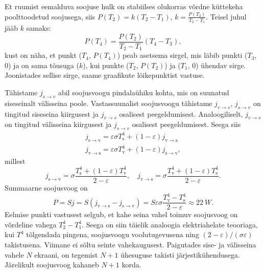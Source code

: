 \documentclass[10pt, twoside]{article}
\begin{document}
{
\solu
Et ruumist eemalduva soojuse hulk on stabiilses olukorras võrdne küttekeha poolttoodetud soojusega, siis $P(T_2) = k(T_2 - T_1)$, $k = \frac{P(T_2)}{T_2-T_1}$. Teisel juhul jääb $k$ samaks:
\[
P(T_4) = \frac{P(T_2)}{T_2-T_1} (T_4 - T_3), 
\]
kust on näha, et punkt ($T_4$, $P(T_4)$) peab asetsema sirgel, mis läbib punkti ($T_3$, $0$) ja on sama tõusuga ($k$), kui punkte ($T_2$, $P(T_2)$) ja ($T_1$, $0$) ühendav sirge. Joonistades sellise sirge, saame graafikute lõikepunktist vastuse.
\probend
\bigskip


\solu
\osa Tähistame $j_{s\rightarrow v}$ abil soojusvoogu pindalaühiku kohta, mis on suunatud siseseinalt välisseina poole. Vastassuunalist soojusvoogu tähistame $j_{v\rightarrow s}$, $j_{s\rightarrow v}$ on tingitud siseseina kiirgusest ja $j_{v\rightarrow s}$ osalisest peegeldumisest. Analoogiliselt, $j_{v\rightarrow s}$ on tingitud välisseina kiirgusest ja $j_{s\rightarrow v}$ osalisest peegeldumisest. Seega siis
\[
\begin{aligned}
{j_{\mathrm{s} \rightarrow \mathrm{v}}=\varepsilon \sigma T_{\mathrm{s}}^{4}+(1-\varepsilon) j_{\mathrm{v} \rightarrow \mathrm{s}}} \\ {j_{\mathrm{v} \rightarrow \mathrm{s}}=\varepsilon \sigma T_{\mathrm{v}}^{4}+(1-\varepsilon) j_{\mathrm{s} \rightarrow \mathrm{v}}},
\end{aligned}
\]
millest
\[
j_{\mathrm{s} \rightarrow \mathrm{v}}=\sigma \frac{T_{\mathrm{s}}^{4}+(1-\varepsilon) T_{\mathrm{v}}^{4}}{2-\varepsilon}, \quad j_{\mathrm{v} \rightarrow \mathrm{s}}=\sigma \frac{T_{\mathrm{v}}^{4}+(1-\varepsilon) T_{\mathrm{s}}^{4}}{2-\varepsilon}.
\]
Summaarne soojusvoog on
\[
P=Sj=S\left(j_{\mathrm{v} \rightarrow \mathrm{s}}-j_{\mathrm{s} \rightarrow \mathrm{v}}\right)=S\varepsilon \sigma \frac{T_{\mathrm{v}}^{4}-T_{\mathrm{s}}^{4}}{2-\varepsilon} \approx \SI{22}{W}.
\]
\osa Eelmise punkti vastusest selgub, et kahe seina vahel toimuv soojusvoog on võrdeline vahega $T_{2}^{4}-T_{1}^{4}$. Seega on siin täielik analoogia elektriahelate teooriaga, kui $T^4$ tõlgendada pingena, soojusvoogu voolutugevusena ning $(2-\varepsilon )/(\sigma \varepsilon)$ takistusena. Viimane ei sõltu seinte vahekaugusest. Paigutades sise- ja välisseina vahele $N$ ekraani, on tegemist $N + 1$ ühesuguse takisti järjestikühendusega. Järelikult soojusvoog kahaneb $N + 1$ korda.
\probend
\bigskip

}
\end{document}

